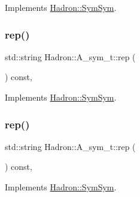 Implements \mbox{\hyperlink{structHadron_1_1SymSym_ae57780f41b9f6c03c6056eed3677bd48}{Hadron\+::\+Sym\+Sym}}.

\mbox{\label{structHadron_1_1A__sym__t_ac60fe125eeb713995aafa4712e23f919}} 
\subsubsection{\texorpdfstring{rep()}{rep()}\hspace{0.1cm}{\footnotesize\ttfamily [1/5]}}
{\footnotesize\ttfamily std\+::string Hadron\+::\+A\+\_\+sym\+\_\+t\+::rep (\begin{DoxyParamCaption}{ }\end{DoxyParamCaption}) const\hspace{0.3cm}{\ttfamily [inline]}, {\ttfamily [virtual]}}



Implements \mbox{\hyperlink{structHadron_1_1SymSym_aa6e588740862036933a9efe085a5e5e5}{Hadron\+::\+Sym\+Sym}}.

\mbox{\label{structHadron_1_1A__sym__t_ac60fe125eeb713995aafa4712e23f919}} 
\subsubsection{\texorpdfstring{rep()}{rep()}\hspace{0.1cm}{\footnotesize\ttfamily [2/5]}}
{\footnotesize\ttfamily std\+::string Hadron\+::\+A\+\_\+sym\+\_\+t\+::rep (\begin{DoxyParamCaption}{ }\end{DoxyParamCaption}) const\hspace{0.3cm}{\ttfamily [inline]}, {\ttfamily [virtual]}}



Implements \mbox{\hyperlink{structHadron_1_1SymSym_aa6e588740862036933a9efe085a5e5e5}{Hadron\+::\+Sym\+Sym}}.

\mbox{\label{structHadron_1_1A__sym__t_ac60fe125eeb713995aafa4712e23f919}} 
